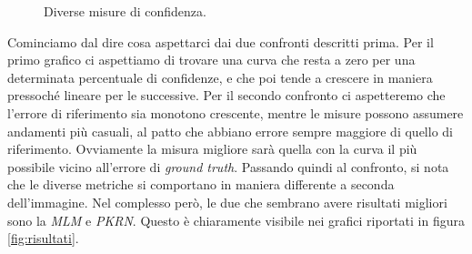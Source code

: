 \documentclass[12pt]{report}
\begin{document}
\begin{figure}[!h]
				 \quad 
				 \quad
				
				\caption{Diverse misure di confidenza.}
				\label{fig:disparità&costi}
			\end{figure}
			
			\noindent Cominciamo dal dire cosa aspettarci dai due confronti descritti prima. Per il primo grafico ci aspettiamo di trovare una curva che resta a zero per una determinata percentuale di confidenze, e che  poi tende a crescere in maniera pressoché lineare per le successive. Per il secondo confronto ci aspetteremo che l'errore di riferimento sia monotono crescente, mentre le misure possono assumere andamenti più casuali, al patto che abbiano errore sempre maggiore di quello di riferimento. Ovviamente la misura migliore sarà quella con la curva il più possibile vicino all'errore di \textit{ground truth}. \newline
			Passando quindi al confronto, si nota che le diverse metriche si comportano in maniera differente a seconda dell'immagine. Nel complesso però, le due che sembrano avere risultati migliori sono la \textit{MLM} e \textit{PKRN}. Questo è chiaramente visibile nei grafici riportati in figura \ref{fig:risultati}.   
			
\end{document}
